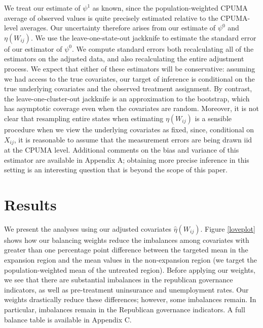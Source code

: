 \documentclass[12pt]{article}
\begin{document}
We treat our estimate of $\psi^1$ as known, since the population-weighted CPUMA average of observed values is quite precisely estimated relative to the CPUMA-level averages. Our uncertainty therefore arises from our estimate of $\psi^0$ and $\eta(W_{ij})$. We use the leave-one-state-out jackknife to estimate the standard error of our estimator of $\psi^0$. We compute standard errors both recalculating all of the estimators on the adjusted data, and also recalculating the entire adjustment process. We expect that either of these estimators will be conservative: assuming we had access to the true covariates, our target of inference is conditional on the true underlying covariates and the observed treatment assignment. By contrast, the leave-one-cluster-out jackknife is an approximation to the bootstrap, which has asymptotic coverage even when the covariates are random. Moreover, it is not clear that resampling entire states when estimating $\eta(W_{ij})$ is a sensible procedure when we view the underlying covariates as fixed, since, conditional on $X_{ij}$, it is reasonable to assume that the measurement errors are being drawn iid at the CPUMA level. Additional comments on the bias and variance of this estimator are available in Appendix A; obtaining more precise inference in this setting is an interesting question that is beyond the scope of this paper.

\section{Results}

We present the analyses using our adjusted covariates $\hat{\eta}(W_{ij})$. Figure \ref{loveplot} shows how our balancing weights reduce the imbalances among covariates with greater than one percentage point difference between the targeted mean in the expansion region and the mean values in the non-expansion region (we target the population-weighted mean of the untreated region). Before applying our weights, we see that there are substantial imbalances in the republican governance indicators, as well as pre-treatment uninsurance and unemployment rates. Our weights drastically reduce these differences; however, some imbalances remain. In particular, imbalances remain in the Republican governance indicators. A full balance table is available in Appendix C. 
\end{document}
